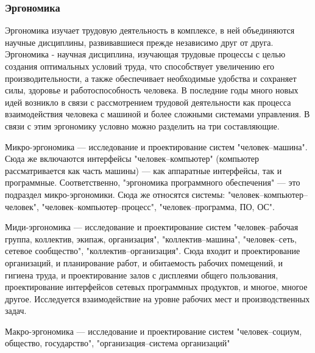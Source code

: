 \subsubsection{Эргономика}
\label{sec:bgd:trud:ergo}
Эргономика изучает трудовую деятельность в комплексе, в ней объединяются научные дисциплины, развивавшиеся прежде независимо друг от друга. 
Эргономика - научная дисциплина, изучающая трудовые процессы с целью создания оптимальных условий труда, что способствует увеличению его производительности, а также обеспечивает необходимые удобства и сохраняет силы, здоровье и работоспособность человека. В последние годы много новых идей возникло в связи с рассмотрением трудовой деятельности как процесса взаимодействия человека с машиной и более сложными системами управления. В связи с этим эргономику условно можно разделить на три составляющие.

\begin{compactitem}
\item Микро-эргономика --- исследование и проектирование систем "человек--машина". Сюда же включаются интерфейсы "человек--компьютер" (компьютер рассматривается как часть машины) --- как аппаратные интерфейсы, так и программные. Соответственно, "эргономика программного обеспечения" --- это подраздел микро-эргономики. Сюда же относятся системы: "человек--компьютер--человек", "человек--компьютер--процесс", "человек--программа, ПО, ОС".
\item Миди-эргономика --- исследование и проектирование систем "человек--рабочая группа, коллектив, экипаж, организация", "коллектив--машина", "человек--сеть, сетевое сообщество", "коллектив--организация". Сюда входит и проектирование организаций, и планирование работ, и обитаемость рабочих помещений, и гигиена труда, и проектирование залов с дисплеями общего пользования, проектирование интерфейсов сетевых программных продуктов, и многое, многое другое. Исследуется взаимодействие на уровне рабочих мест и производственных задач.
\item Макро-эргономика --- исследование и проектирование систем "человек--социум, общество, государство", "организация--система организаций"
\end{compactitem}


